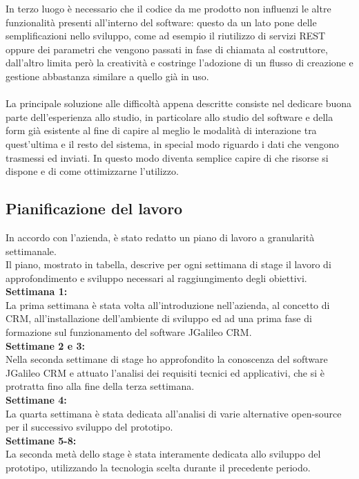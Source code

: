 In terzo luogo è necessario che il codice da me prodotto non influenzi le altre funzionalità presenti all'interno del software: questo da un lato pone delle semplificazioni nello sviluppo, come ad esempio il riutilizzo di servizi REST oppure dei parametri che vengono passati in fase di chiamata al costruttore, dall'altro limita però la creatività e costringe l'adozione di un flusso di creazione e gestione abbastanza similare a quello già in uso.\\
\\
La principale soluzione alle difficoltà appena descritte consiste nel dedicare buona parte dell'esperienza allo studio, in particolare allo studio del software e della form già esistente al fine di capire al meglio le modalità di interazione tra quest'ultima e il resto del sistema, in special modo riguardo i dati che vengono trasmessi ed inviati. In questo modo diventa semplice capire di che risorse si dispone e di come ottimizzarne l'utilizzo.\\



\subsection{Pianificazione del lavoro}
In accordo con l'azienda, è stato redatto un piano di lavoro a granularità settimanale. \\
Il piano, mostrato in tabella, descrive per ogni settimana di stage il lavoro di approfondimento e sviluppo necessari al raggiungimento degli obiettivi. \\%

\textbf{Settimana 1:}\\
La prima settimana è stata volta all'introduzione nell'azienda, al concetto di CRM, all'installazione dell'ambiente di sviluppo ed ad una prima fase di formazione sul funzionamento del software JGalileo CRM.\\
\textbf{Settimane 2 e 3:}\\
Nella seconda settimane di stage ho approfondito la conoscenza del software JGalileo CRM e attuato l'analisi dei requisiti tecnici ed applicativi, che si è protratta fino alla fine della terza settimana.\\
\textbf{Settimane 4:}\\
La quarta settimana è stata dedicata all'analisi di varie alternative open-source per il successivo sviluppo del prototipo. \\
\textbf{Settimane 5-8:}\\
La seconda metà dello stage è stata interamente dedicata allo sviluppo del prototipo, utilizzando la tecnologia scelta durante il precedente periodo.\\

